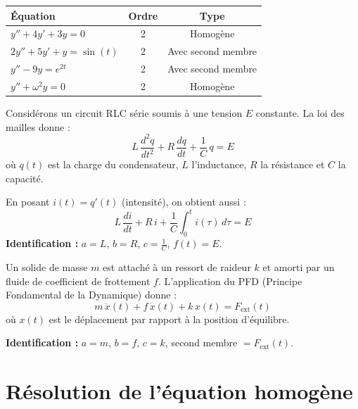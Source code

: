 \documentclass[a4paper,11pt]{article}
\begin{document}
\begin{exemple}[-- Vocabulaire]
\renewcommand{\arraystretch}{1.4}
\begin{center}
\begin{tabular}{>{\raggedright}p{7cm} c c}
\toprule
\textbf{Équation} & \textbf{Ordre} & \textbf{Type} \\
\midrule
$y'' + 4y' + 3y = 0$ & 2 & Homogène \\
$2y'' + 5y' + y = \sin(t)$ & 2 & Avec second membre \\
$y'' - 9y = e^{2t}$ & 2 & Avec second membre \\
$y'' + \omega^2 y = 0$ & 2 & Homogène \\
\bottomrule
\end{tabular}
\end{center}
\end{exemple}

\begin{appliindus}
Considérons un circuit RLC série soumis à une tension $E$ constante. La loi des mailles donne :
\[
L\,\frac{d^2q}{dt^2} + R\,\frac{dq}{dt} + \frac{1}{C}\,q = E
\]
où $q(t)$ est la charge du condensateur, $L$ l'inductance, $R$ la résistance et $C$ la capacité.

En posant $i(t) = q'(t)$ (intensité), on obtient aussi :
\[
L\,\frac{di}{dt} + R\,i + \frac{1}{C}\int_0^t i(\tau)\,d\tau = E
\]
\textbf{Identification :} $a = L$, $b = R$, $c = \frac{1}{C}$, $f(t) = E$.
\end{appliindus}

\begin{appliindus}
Un solide de masse $m$ est attaché à un ressort de raideur $k$ et amorti par un fluide de coefficient de frottement $f$. L'application du PFD (Principe Fondamental de la Dynamique) donne :
\[
m\,\ddot{x}(t) + f\,\dot{x}(t) + k\,x(t) = F_{\text{ext}}(t)
\]
où $x(t)$ est le déplacement par rapport à la position d'équilibre.

\textbf{Identification :} $a = m$, $b = f$, $c = k$, second membre $= F_{\text{ext}}(t)$.
\end{appliindus}

\newpage
\section{Résolution de l'équation homogène}
\end{document}
